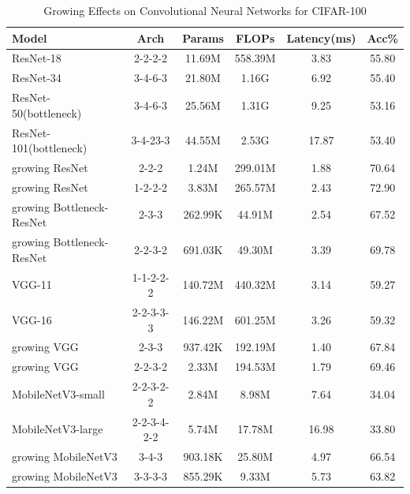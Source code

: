\documentclass[preprint,12pt]{elsarticle}
\begin{document}
\begin{table}[ht]
\centering
\tiny
\renewcommand{\arraystretch}{1.3}
\begin{adjustbox}{center}
\begin{tabular}{lccccc}
\hline
\textbf{Model} & \textbf{Arch} & \textbf{Params} & \textbf{FLOPs} & \textbf{Latency(ms)} & \textbf{Acc\%} \\
\hline
ResNet-18 & 2-2-2-2 & 11.69M & 558.39M & 3.83 & 55.80 \\
ResNet-34 & 3-4-6-3 & 21.80M & 1.16G & 6.92 & 55.40 \\
ResNet-50(bottleneck) & 3-4-6-3 & 25.56M & 1.31G & 9.25 & 53.16 \\
ResNet-101(bottleneck) & 3-4-23-3 & 44.55M & 2.53G & 17.87 & 53.40 \\
growing ResNet & 2-2-2 & 1.24M & 299.01M & 1.88 & 70.64 \\
growing ResNet & 1-2-2-2 & 3.83M & 265.57M & 2.43 & 72.90 \\
growing Bottleneck-ResNet & 2-3-3 & 262.99K & 44.91M & 2.54 & 67.52 \\
growing Bottleneck-ResNet & 2-2-3-2 & 691.03K & 49.30M & 3.39 & 69.78 \\ \hline
VGG-11 & 1-1-2-2-2 & 140.72M & 440.32M & 3.14 & 59.27 \\
VGG-16 & 2-2-3-3-3 & 146.22M & 601.25M & 3.26 & 59.32 \\
growing VGG & 2-3-3 & 937.42K & 192.19M & 1.40 & 67.84 \\
growing VGG & 2-2-3-2 & 2.33M & 194.53M & 1.79 & 69.46 \\ \hline
MobileNetV3-small & 2-2-3-2-2 & 2.84M & 8.98M & 7.64 & 34.04 \\
MobileNetV3-large & 2-2-3-4-2-2 & 5.74M & 17.78M & 16.98 & 33.80 \\
growing MobileNetV3 & 3-4-3 & 903.18K & 25.80M & 4.97 & 66.54 \\
growing MobileNetV3 & 3-3-3-3 & 855.29K & 9.33M & 5.73 & 63.82 \\
\hline
\end{tabular}
\end{adjustbox}
\caption{Growing Effects on Convolutional Neural Networks for CIFAR-100}
\label{table:cifar100_self_growth}
\end{table}
\end{document}
